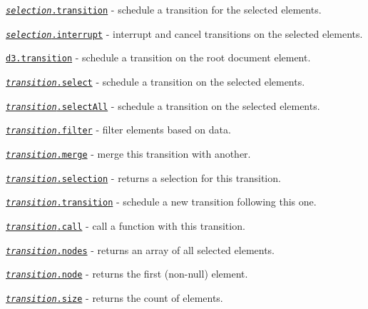 \begin{DoxyItemize}
\item \href{https://github.com/d3/d3-transition/blob/master/README.md#selection_transition}{\tt {\itshape selection}.transition} -\/ schedule a transition for the selected elements.
\item \href{https://github.com/d3/d3-transition/blob/master/README.md#selection_interrupt}{\tt {\itshape selection}.interrupt} -\/ interrupt and cancel transitions on the selected elements.
\item \href{https://github.com/d3/d3-transition/blob/master/README.md#transition}{\tt d3.\+transition} -\/ schedule a transition on the root document element.
\item \href{https://github.com/d3/d3-transition/blob/master/README.md#transition_select}{\tt {\itshape transition}.select} -\/ schedule a transition on the selected elements.
\item \href{https://github.com/d3/d3-transition/blob/master/README.md#transition_selectAll}{\tt {\itshape transition}.select\+All} -\/ schedule a transition on the selected elements.
\item \href{https://github.com/d3/d3-transition/blob/master/README.md#transition_filter}{\tt {\itshape transition}.filter} -\/ filter elements based on data.
\item \href{https://github.com/d3/d3-transition/blob/master/README.md#transition_merge}{\tt {\itshape transition}.merge} -\/ merge this transition with another.
\item \href{https://github.com/d3/d3-transition/blob/master/README.md#transition_selection}{\tt {\itshape transition}.selection} -\/ returns a selection for this transition.
\item \href{https://github.com/d3/d3-transition/blob/master/README.md#transition_transition}{\tt {\itshape transition}.transition} -\/ schedule a new transition following this one.
\item \href{https://github.com/d3/d3-transition/blob/master/README.md#transition_call}{\tt {\itshape transition}.call} -\/ call a function with this transition.
\item \href{https://github.com/d3/d3-transition/blob/master/README.md#transition_nodes}{\tt {\itshape transition}.nodes} -\/ returns an array of all selected elements.
\item \href{https://github.com/d3/d3-transition/blob/master/README.md#transition_node}{\tt {\itshape transition}.node} -\/ returns the first (non-\/null) element.
\item \href{https://github.com/d3/d3-transition/blob/master/README.md#transition_size}{\tt {\itshape transition}.size} -\/ returns the count of elements.

\end{DoxyItemize}

